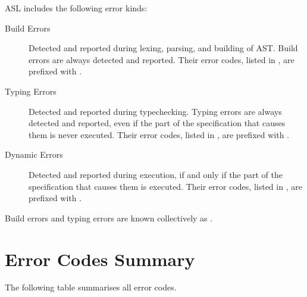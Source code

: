 ASL includes the following error kinds:
\begin{description}
  \item[Build Errors]
    Detected and reported during lexing, parsing, and building of AST.
    Build errors are always detected and reported.
    Their error codes, listed in , are prefixed with \BuildErrorPrefix.

  \item[Typing Errors]
    Detected and reported during typechecking.
    Typing errors are always detected and reported, even if the part of the specification that causes them is never executed.
    Their error codes, listed in , are prefixed with \TypeErrorPrefix.

  \item[Dynamic Errors]
    Detected and reported during execution, if and only if the part of the specification that causes them is executed.
    Their error codes, listed in , are prefixed with \DynamicErrorPrefix.
\end{description}

\hypertarget{def-staticerrorterm}{}
Build errors and typing errors are known collectively as \emph{\staticerrorsterm}.

\section{Error Codes Summary}
The following table summarises all error codes.

